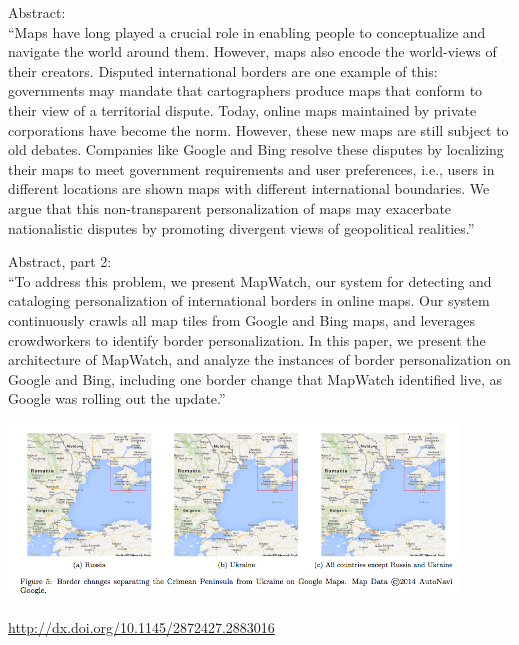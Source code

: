 \documentclass{beamer}
\def\vf{\vfill}
\begin{document}
\begin{frame}

Abstract:\\
``Maps have long played a crucial role in enabling people to conceptualize and navigate the world around them. However, maps also encode the world-views of their creators. Disputed international borders are one example of this: governments may mandate that cartographers produce maps that conform to their view of a territorial dispute. Today, online maps maintained by private corporations have become the norm. However, these new maps are still subject to old debates. Companies like Google and Bing resolve these disputes by localizing their maps to meet government requirements and user preferences, i.e., users in different locations are shown maps with different international boundaries. We argue that this non-transparent personalization of maps may exacerbate nationalistic disputes by promoting divergent views of geopolitical realities.''

\end{frame}
\begin{frame}

Abstract, part 2:\\
``To address this problem, we present MapWatch, our system for detecting and cataloging personalization of international borders in online maps. Our system continuously crawls all map tiles from Google and Bing maps, and leverages crowdworkers to identify border personalization. In this paper, we present the architecture of MapWatch, and analyze the instances of border personalization on Google and Bing, including one border change that MapWatch identified live, as Google was rolling out the update.''

\end{frame}
\begin{frame}

\begin{center}
\includegraphics[width=0.9\textwidth]{figures/soeller_mapwatch_2016_fig5.png}
\end{center}

\vf
\url{http://dx.doi.org/10.1145/2872427.2883016}
\end{frame}
\end{document}

